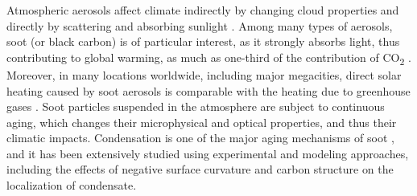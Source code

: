 Atmospheric aerosols affect climate indirectly by changing cloud properties \citep{lohmann2005global,tao2012impact} and directly by scattering and absorbing sunlight \citep{chylek1995effect}. Among many types of aerosols, soot (or black carbon) is of particular interest, as it strongly absorbs light, thus contributing to global warming, as much as one-third of the contribution of CO\textsubscript{2} \citep{RN21}. Moreover, in many locations worldwide, including major megacities, direct solar heating caused by soot aerosols is comparable with the heating due to greenhouse gases \citep{RN45}. Soot particles suspended in the atmosphere are subject to continuous aging, which changes their microphysical and optical properties, and thus their climatic impacts. Condensation is one of the major aging mechanisms of soot \citep{saathoff2003coating}, and it has been extensively studied using experimental and modeling approaches, including the effects of negative surface curvature \citep{RN70,ivanova2020kinetic} and carbon structure \citep{ivanova2022molecular} on the localization of condensate.









